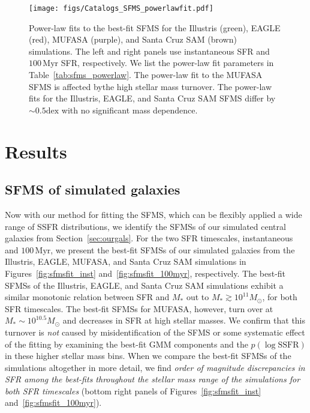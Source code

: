 \documentclass[preprint2,tighten]{aastex62}
\begin{document}
\begin{figure}
\begin{center}
\texttt{[image: figs/Catalogs\_SFMS\_powerlawfit.pdf]} 
\caption{Power-law fits to the best-fit SFMS for the Illustris (green), 
    EAGLE (red), MUFASA (purple), and Santa Cruz SAM (brown) simulations. 
    The left and right panels use instantaneous SFR and $100\,\mathrm{Myr}$ 
    SFR, respectively. We list the power-law fit parameters in 
    Table~\ref{tab:sfms_powerlaw}. The power-law fit to the MUFASA SFMS 
    is affected bythe high stellar mass turnover. The power-law fits for 
    the Illustris, EAGLE, and Santa Cruz SAM SFMS differ by ${\sim}0.5\mathrm{dex}$
    with no significant mass dependence.}
    \label{fig:sfmsfit_powerlaw}
\end{center}
\end{figure}

\section{Results} \label{sec:results}
\subsection{SFMS of simulated galaxies}
Now with our method for fitting the SFMS, which can be flexibly 
applied a wide range of SSFR distributions, we identify the SFMSs of our simulated
central galaxies from Section~\ref{sec:ourgals}. For the two SFR timescales,
instantaneous and $100\,\mathrm{Myr}$, we present the best-fit SFMSs of our 
simulated galaxies from the Illustris, EAGLE, MUFASA, and Santa Cruz SAM 
simulations in Figures~\ref{fig:sfmsfit_inst} and~\ref{fig:sfmsfit_100myr}, 
respectively. %
The best-fit SFMSs of the Illustris, EAGLE, and Santa Cruz SAM simulations
exhibit a similar monotonic relation between SFR and $M_*$ out to 
$M_* \gtrsim 10^{11}M_\odot$, for both SFR timescales. The best-fit SFMSs 
for MUFASA, however, turn over at 
$M_* \sim 10^{10.5} M_\odot$ and decreases in SFR at high stellar masses. 
We confirm that this turnover is \emph{not} caused by misidentification of 
the SFMS or some systematic effect of the fitting by examining the 
best-fit GMM components  and the $p(\log\mathrm{SSFR})$ in these higher 
stellar mass bins. When we compare the best-fit SFMSs of the simulations 
altogether in more detail, we find \emph{order of magnitude discrepancies 
in SFR among the best-fits throughout the stellar mass range of the 
simulations for both SFR timescales} (bottom right panels of 
Figures~\ref{fig:sfmsfit_inst} and~\ref{fig:sfmsfit_100myr}). 
\end{document}
